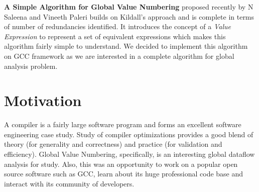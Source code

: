 \textbf{A Simple Algorithm for Global Value Numbering} proposed recently by N Saleena and Vineeth Paleri\cite{sagvn} builds on Kildall's approach and is complete in terms of number of redundancies identified. It introduces the concept of a \emph{Value Expression} to represent a set of equivalent expressions which makes this algorithm fairly simple to understand. We decided to implement this algorithm on GCC framework as we are interested in a complete algorithm for global analysis problem.

\section{Motivation}
A compiler is a fairly large software program and forms an excellent software engineering case study. Study of compiler optimizations provides a good blend of theory (for generality and correctness) and practice (for validation and efficiency). Global Value Numbering, specifically, is an interesting global dataflow analysis for study. Also, this was an opportunity to work on a popular open source software such as GCC, learn about its huge professional code base and interact with its community of developers.
